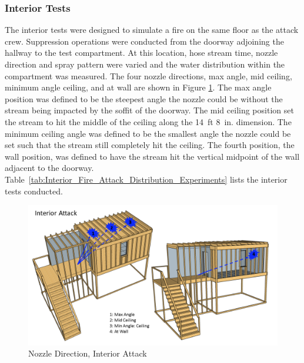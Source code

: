 \documentclass{article}
\begin{document}
\subsubsection{Interior Tests}
\label{int_tests}
The interior tests were designed to simulate a fire on the same floor as the attack crew. Suppression operations were conducted from the doorway adjoining the hallway to the test compartment. At this location, hose stream time, nozzle direction and spray pattern were varied and the water distribution within the compartment was measured. The four nozzle directions, max angle, mid ceiling, minimum angle ceiling, and at wall are shown in Figure \ref{fig:Nozzle_Direction_Interior_Attack}. The max angle position was defined to be the steepest angle the nozzle could be without the stream being impacted by the soffit of the doorway. The mid ceiling position set the stream to hit the middle of the ceiling along the 14~ft 8~in. dimension. The minimum ceiling angle was defined to be the smallest angle the nozzle could be set such that the stream still completely hit the ceiling. The fourth position, the wall position, was defined to have the stream hit the vertical midpoint of the wall adjacent to the doorway. Table~\ref{tab:Interior_Fire_Attack_Distribution_Experiments} lists the interior tests conducted.

\begin{figure}[!ht]
	\centering
	\includegraphics[width=\columnwidth]{Figures/Water_Distribution/Nozzle_Position_Int}
	\caption{Nozzle Direction, Interior Attack}
	\label{fig:Nozzle_Direction_Interior_Attack}
\end{figure}
\end{document}
